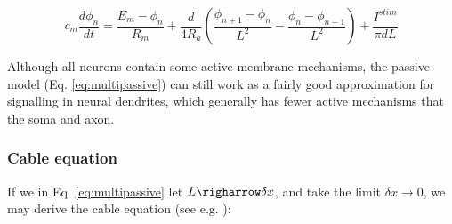 \begin{equation}
c_m \frac{d\phi_n}{dt} = \frac{E_m-\phi_n}{R_m} + \frac{d}{4R_a}\left(\frac{\phi_{n+1}-\phi_n}{L^2} - \frac{\phi_n-\phi_{n-1}}{L^2} \right) + \frac{I^{stim}}{\pi d L}
\label{eq:multipassive}
\end{equation}

Although all neurons contain some active membrane mechanisms, the passive model (Eq. \ref{eq:multipassive}) can still work as a fairly good approximation for signalling in neural dendrites, which generally has fewer active mechanisms that the soma and axon. 


\subsubsection{Cable equation}
If we in Eq. \ref{eq:multipassive} let $L \righarrow \delta x$, and take the limit $\delta x \rightarrow 0$, we may derive the cable equation (see e.g. \cite{Sterratt2011}): 
